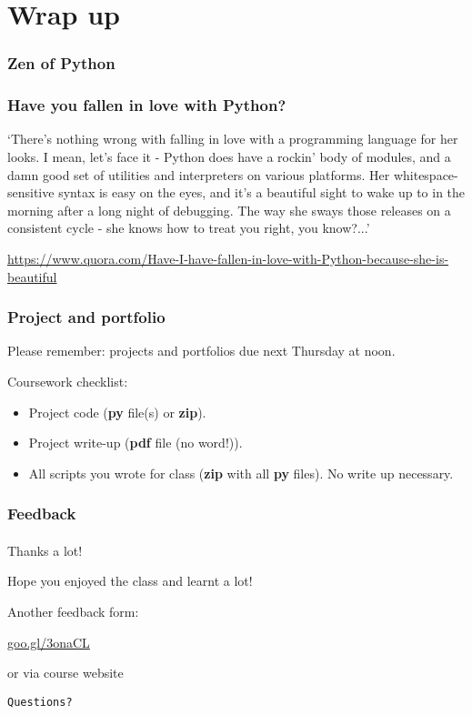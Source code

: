 \section{Wrap up}

\begin{frame}\frametitle{Zen of Python}


\end{frame}

\begin{frame}\frametitle{Have you fallen in love with Python?}

    `There's nothing wrong with falling in love with a programming language for her looks. I mean, let's face it - Python does have a rockin' body of modules, and a damn good set of utilities and interpreters on various platforms. Her whitespace-sensitive syntax is easy on the eyes, and it's a beautiful sight to wake up to in the morning after a long night of debugging. The way she sways those releases on a consistent cycle - she knows how to treat you right, you know?...'

    \url{https://www.quora.com/Have-I-have-fallen-in-love-with-Python-because-she-is-beautiful}

\end{frame}

\begin{frame}\frametitle{Project and portfolio}

    Please remember: projects and portfolios due next Thursday at noon.

    Coursework checklist:
    \begin{itemize}
        \item Project code (\textbf{py} file(s) or \textbf{zip}).
        \item Project write-up (\textbf{pdf} file (no word!)).
        \item All scripts you wrote for class (\textbf{zip} with all \textbf{py} files). No write up necessary.
    \end{itemize}

\end{frame}

\begin{frame}\frametitle{Feedback}
    \framesubtitle{}

    Thanks a lot!

    Hope you enjoyed the class and learnt a lot!

    \vfill

    Another feedback form:
    \begin{center}
            \url{goo.gl/3onaCL}
    \end{center}
    or via course website

    \vfill

    \texttt{Questions?}

\end{frame}